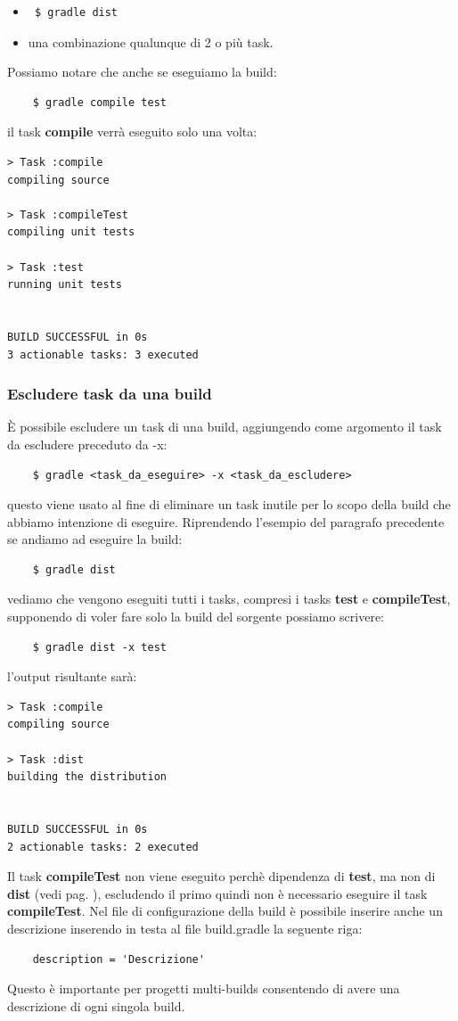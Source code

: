 \documentclass{article}
\begin{document}
\begin{flushleft}
\begin{itemize}
    \item \begin{verbatim} $ gradle dist \end{verbatim}
    \item una combinazione qualunque di 2 o più task.
\end{itemize}
Possiamo notare che anche se eseguiamo la build: 
\begin{verbatim}
    $ gradle compile test \end{verbatim}
il task \textbf{compile} verrà eseguito solo una volta:
\begin{verbatim}
> Task :compile 
compiling source

> Task :compileTest 
compiling unit tests

> Task :test 
running unit tests


BUILD SUCCESSFUL in 0s
3 actionable tasks: 3 executed \end{verbatim}

\subsubsection{Escludere task da una build}
È possibile escludere un task di una build, aggiungendo come argomento il task da escludere preceduto da -x:
\begin{verbatim}
    $ gradle <task_da_eseguire> -x <task_da_escludere> \end{verbatim}
questo viene usato al fine di eliminare un task inutile per lo scopo della build che abbiamo intenzione di eseguire. Riprendendo l'esempio del paragrafo precedente se andiamo ad eseguire la build:
\begin{verbatim}
    $ gradle dist \end{verbatim}
vediamo che vengono eseguiti tutti i tasks, compresi i tasks \textbf{test} e \textbf{compileTest}, supponendo di voler fare solo la build del sorgente possiamo scrivere:
\begin{verbatim}
    $ gradle dist -x test
\end{verbatim}
l'output risultante sarà:
\begin{verbatim}
> Task :compile 
compiling source

> Task :dist 
building the distribution


BUILD SUCCESSFUL in 0s
2 actionable tasks: 2 executed \end{verbatim}
Il task \textbf{compileTest} non viene eseguito perchè dipendenza di \textbf{test}, ma non di \textbf{dist} (vedi pag. \pageref{taskdip}), escludendo il primo quindi non è necessario eseguire il task \textbf{compileTest}. Nel file di configurazione della build è possibile inserire anche un descrizione inserendo in testa al file build.gradle la seguente riga:
\begin{verbatim}
    description = 'Descrizione' \end{verbatim}
Questo è importante per progetti multi-builds consentendo di avere una descrizione di ogni singola build.


\end{flushleft}
\end{document}
